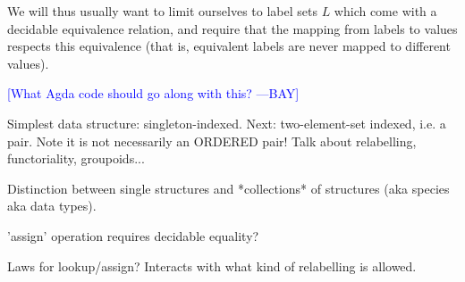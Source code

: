 \documentclass{jfp}
\newcommand{\authornote}[3]{\textcolor{#1}{[#3 ---#2]}}
\newcommand{\authornote}[3]{}
\newcommand{\bay}[1]{\authornote{blue}{BAY}{#1}}
\begin{document}
We will thus usually want to limit ourselves to label sets $L$ which
come with a decidable equivalence relation, and require that the
mapping from labels to values respects this equivalence (that is,
equivalent labels are never mapped to different values).

\bay{What Agda code should go along with this?}


\begin{commentary}
  Simplest data structure: singleton-indexed.  Next: two-element-set
  indexed, i.e. a pair.  Note it is not necessarily an ORDERED pair!
  Talk about relabelling, functoriality, groupoids...

  Distinction between single structures and *collections* of
  structures (aka species aka data types).

  'assign' operation requires decidable equality?

  Laws for lookup/assign?  Interacts with what kind of relabelling is
  allowed.
\end{commentary}
\end{document}
